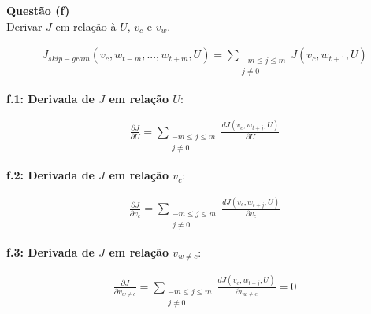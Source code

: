\documentclass[a4paper,12pt]{article}
\begin{document}
{\Large \textbf{Questão (f)}}\\

Derivar $J$ em relação à $U$, $v_c$ e $v_w$.

\begin{align}
J_{skip-gram} (v_c, w_{t−m}, ... , w_{t+m}, U ) =  \sum_{ \substack{ -m \leq j \leq m \\ j \neq 0 }} J( v_c, w_{t+1}, U )
\end{align}

\textbf{f.1: Derivada de $J$ em relação $U$}:

\begin{align}
\frac{\partial J}{\partial U} =  \sum_{ \substack{ -m \leq j \leq m \\ j \neq 0 }} \frac{d J( v_c, w_{t+j}, U ) }{ \partial U}
\end{align}

\textbf{f.2: Derivada de $J$ em relação $v_c$}:

\begin{align}
\frac{\partial J}{\partial v_c} =  \sum_{ \substack{ -m \leq j \leq m \\ j \neq 0 }} \frac{d J( v_c, w_{t+j}, U ) }{\partial v_c}
\end{align}

\textbf{f.3: Derivada de $J$ em relação $v_{w \neq c }$}:

\begin{align}
\frac{\partial J}{\partial v_{w \neq c}} =  \sum_{ \substack{ -m \leq j \leq m \\ j \neq 0 }} \frac{d J( v_c, w_{t+j}, U ) }{\partial v_{w \neq c}}  = 0
\end{align}


\noindent
\end{document}
